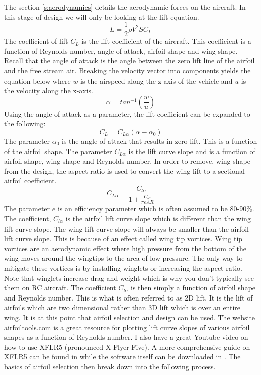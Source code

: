 The section \ref{s:aerodynamics} details the aerodynamic forces on the
aircraft. In this stage of design we will only be looking at the lift
equation.
\begin{equation}
L = \frac{1}2\rho {V}^2 S C_L
\end{equation}
The coefficient of lift $C_L$ is the lift coefficient of the
aircraft. This coefficient is a function of Reynolds number, angle of
attack, airfoil shape and wing shape. Recall that the angle of attack
is the angle between the zero lift line of the airfoil and the free
stream air. Breaking the velocity vector into components yields the
equation below where $w$ is the airspeed along the z-axis of the
vehicle and $u$ is the velocity along the x-axis. 
\begin{equation}\label{e:aoa}
\alpha = tan^{-1}\left(\frac{w} {u} \right)
\end{equation}
Using the angle of attack as a parameter, the lift coefficient can be
expanded to the following:
\begin{equation}
C_L = C_{L\alpha}(\alpha-\alpha_0)
\end{equation}
The parameter $\alpha_0$ is the angle of attack that results in zero
lift. This is a function of the airfoil shape. The parameter
$C_{L\alpha}$ is the lift curve slope and is a function of airfoil
shape, wing shape and Reynolds number. In order to remove, wing shape
from the design, the aspect ratio is used to convert the wing lift to
a sectional airfoil coefficient.
\begin{equation}\label{e:ar_equation}
C_{L\alpha} = \frac{C_{l\alpha}}{1+\frac{C_{l\alpha}}{\pi e AR}}
\end{equation}
The parameter $e$ is an efficiency parameter which is often assumed to
be 80-90\%. The coefficient, $C_{l\alpha}$ is the airfoil lift curve
slope which is different than the wing lift curve slope. The wing lift curve slope
will always be smaller than the airfoil lift curve slope. This is
because of an effect called wing tip vortices. Wing tip vortices are
an aerodynamic effect where high pressure from the bottom of the wing
moves around the wingtips to the area of low pressure. The only way to
mitigate these vortices is by installing winglets or increasing the
aspect ratio. Note that winglets increase drag and weight which is why
you don't typically see them on RC aircraft. The coefficient
$C_{l\alpha}$ is then simply a function of airfoil shape and
Reynolds number. This is what is often referred to as 2D lift. It is
the lift of airfoils which are two dimensional rather than 3D lift
which is over an entire wing. It is at this point that airfoil
selection and design can be used. The website \url{airfoiltools.com}
is a great resource for plotting lift curve slopes of various airfoil
shapes as a function of Reynolds number. I also have a great Youtube
video on how to use XFLR5 (pronounced X-Flyer
Five)\cite{XFLR5_tutorial}. A more comprehensive guide on XFLR5 can be
found in \cite{XFLR5_Guidelines} while the software itself can be
downloaded in \cite{XFLR5}. The basics of airfoil selection then break
down into the following 
process.

